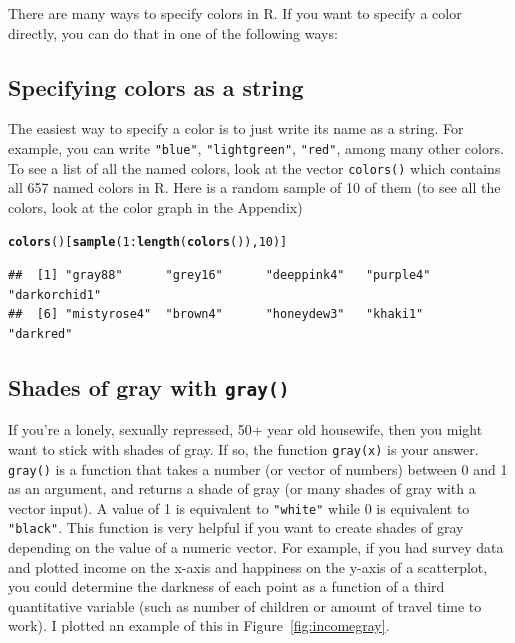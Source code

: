 \documentclass{tufte-book}\usepackage[]{graphicx}\usepackage[]{color}
\makeatletter
\newcommand{\hlnum}[1]{\textcolor[rgb]{0.686,0.059,0.569}{#1}}%
\newcommand{\hlopt}[1]{\textcolor[rgb]{0,0,0}{#1}}%
\newcommand{\hlstd}[1]{\textcolor[rgb]{0.345,0.345,0.345}{#1}}%
\newcommand{\hlkwd}[1]{\textcolor[rgb]{0.737,0.353,0.396}{\textbf{#1}}}%
\newenvironment{kframe}{%
 \def\at@end@of@kframe{}%
 \ifinner\ifhmode%
  \def\at@end@of@kframe{\end{minipage}}%
  \begin{minipage}{\columnwidth}%
 \fi\fi%
 \def\FrameCommand##1{\hskip\@totalleftmargin \hskip-\fboxsep
 \colorbox{shadecolor}{##1}\hskip-\fboxsep
     \hskip-\linewidth \hskip-\@totalleftmargin \hskip\columnwidth}%
 \MakeFramed {\advance\hsize-\width
   \@totalleftmargin\z@ \linewidth\hsize
   \@setminipage}}%
 {\par\unskip\endMakeFramed%
 \at@end@of@kframe}
\newenvironment{knitrout}{}{} %
\makeatother
\begin{document}
There are many ways to specify colors in R. If you want to specify a color directly, you can do that in one of the following ways:

\subsection{Specifying colors as a string}

The easiest way to specify a color is to just write its name as a string. For example, you can write \texttt{"blue"}, \texttt{"lightgreen"}, \texttt{"red"}, among many other colors. To see a list of all the named colors, look at the vector \texttt{colors()} which contains all 657 named colors in R. Here is a random sample of 10 of them (to see all the colors, look at the color graph in the Appendix)

\begin{footnotesize}
\begin{knitrout}
\color{fgcolor}\begin{kframe}
\begin{alltt}
\hlkwd{colors}\hlstd{()[}\hlkwd{sample}\hlstd{(}\hlnum{1}\hlopt{:}\hlkwd{length}\hlstd{(}\hlkwd{colors}\hlstd{()),} \hlnum{10}\hlstd{)]}
\end{alltt}
\begin{verbatim}
##  [1] "gray88"      "grey16"      "deeppink4"   "purple4"     "darkorchid1"
##  [6] "mistyrose4"  "brown4"      "honeydew3"   "khaki1"      "darkred"
\end{verbatim}
\end{kframe}
\end{knitrout}
\end{footnotesize}

\subsection{Shades of gray with \texttt{gray()}}

If you're a lonely, sexually repressed, 50+ year old housewife, then you might want to stick with shades of gray. If so, the function \texttt{gray(x)} is your answer. \texttt{gray()} is a function that takes a number (or vector of numbers) between 0 and 1 as an argument, and returns a shade of gray (or many shades of gray with a vector input). A value of 1 is equivalent to \texttt{"white"} while 0 is equivalent to \texttt{"black"}. This function is very helpful if you want to create shades of gray depending on the value of a numeric vector. For example, if you had survey data and plotted income on the x-axis and happiness on the y-axis of a scatterplot, you could determine the darkness of each point as a function of a third quantitative variable (such as number of children or amount of travel time to work). I plotted an example of this in Figure~\ref{fig:incomegray}.
\end{document}
